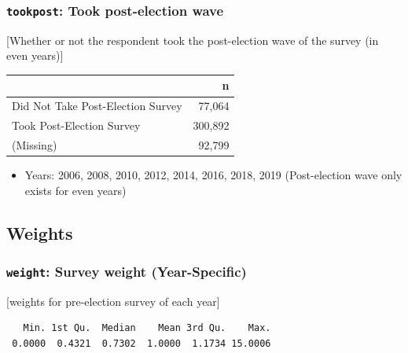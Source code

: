 \documentclass[10pt,article,oneside]{memoir}
\theoremstyle{definition}
\begin{document}
\hypertarget{tookpost-took-post-election-wave}{%
\subsubsection{\texorpdfstring{\texttt{tookpost}: Took post-election
wave}{tookpost: Took post-election wave}}\label{tookpost-took-post-election-wave}}

{[}Whether or not the respondent took the post-election wave of the
survey (in even years){]}

\begin{table}[H]
\centering
\begin{tabular}{lr}
\toprule
 & n\\
\midrule
Did Not Take Post-Election Survey & 77,064\\
Took Post-Election Survey & 300,892\\
(Missing) & 92,799\\
\bottomrule
\end{tabular}
\end{table}

\begin{itemize}
\tightlist
\item
  Years: 2006, 2008, 2010, 2012, 2014, 2016, 2018, 2019 (Post-election
  wave only exists for even years)
\end{itemize}

\hypertarget{weights}{%
\subsection{Weights}\label{weights}}

\hypertarget{weight-survey-weight-year-specific}{%
\subsubsection{\texorpdfstring{\texttt{weight}: Survey weight
(Year-Specific)}{weight: Survey weight (Year-Specific)}}\label{weight-survey-weight-year-specific}}

{[}weights for pre-election survey of each year{]}

\begin{verbatim}
   Min. 1st Qu.  Median    Mean 3rd Qu.    Max. 
 0.0000  0.4321  0.7302  1.0000  1.1734 15.0006 
\end{verbatim}
\end{document}
